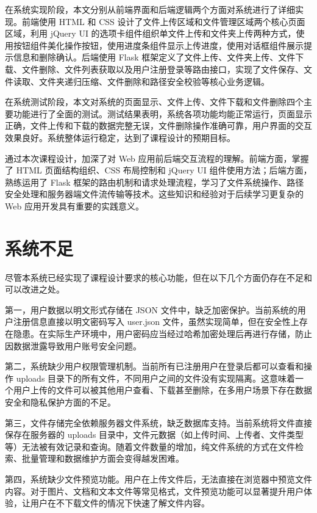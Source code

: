 \documentclass[UTF8,zihao=-4]{ctexrep}
\begin{document}
在系统实现阶段，本文分别从前端界面和后端逻辑两个方面对系统进行了详细实现。前端使用 HTML 和 CSS 设计了文件上传区域和文件管理区域两个核心页面区域，利用 jQuery UI 的选项卡组件组织单文件上传和文件夹上传两种方式，使用按钮组件美化操作按钮，使用进度条组件显示上传进度，使用对话框组件展示提示信息和删除确认。后端使用 Flask 框架定义了文件上传、文件夹上传、文件下载、文件删除、文件列表获取以及用户注册登录等路由接口，实现了文件保存、文件读取、文件夹递归压缩、文件删除和路径安全校验等核心业务逻辑。

在系统测试阶段，本文对系统的页面显示、文件上传、文件下载和文件删除四个主要功能进行了全面的测试。测试结果表明，系统各项功能均能正常运行，页面显示正确，文件上传和下载的数据完整无误，文件删除操作准确可靠，用户界面的交互效果良好。系统整体运行稳定，达到了课程设计的预期目标。

通过本次课程设计，加深了对 Web 应用前后端交互流程的理解。前端方面，掌握了 HTML 页面结构组织、CSS 布局控制和 jQuery UI 组件使用方法；后端方面，熟练运用了 Flask 框架的路由机制和请求处理流程，学习了文件系统操作、路径安全处理和服务器端文件流传输等技术。这些知识和经验对于后续学习更复杂的 Web 应用开发具有重要的实践意义。

\section{系统不足}

尽管本系统已经实现了课程设计要求的核心功能，但在以下几个方面仍存在不足和可以改进之处。

第一，用户数据以明文形式存储在 JSON 文件中，缺乏加密保护。当前系统的用户注册信息直接以明文密码写入 user.json 文件，虽然实现简单，但在安全性上存在隐患。在实际生产环境中，用户密码应当经过哈希加密处理后再进行存储，防止因数据泄露导致用户账号安全问题。

第二，系统缺少用户权限管理机制。当前所有已注册用户在登录后都可以查看和操作 uploads 目录下的所有文件，不同用户之间的文件没有实现隔离。这意味着一个用户上传的文件可以被其他用户查看、下载甚至删除，在多用户场景下存在数据安全和隐私保护方面的不足。

第三，文件存储完全依赖服务器文件系统，缺乏数据库支持。当前系统将文件直接保存在服务器的 uploads 目录中，文件元数据（如上传时间、上传者、文件类型等）无法被有效记录和查询。随着文件数量的增加，纯文件系统的方式在文件检索、批量管理和数据维护方面会变得越发困难。

第四，系统缺少文件预览功能。用户在上传文件后，无法直接在浏览器中预览文件内容。对于图片、文档和文本文件等常见格式，文件预览功能可以显著提升用户体验，让用户在不下载文件的情况下快速了解文件内容。
\end{document}
